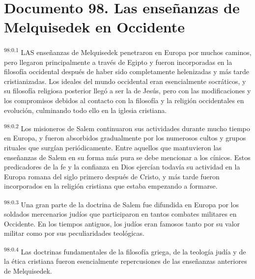 \chapter{Documento 98. Las enseñanzas de Melquisedek en Occidente}
\par
\textsuperscript{98:0.1} LAS enseñanzas de Melquisedek penetraron en Europa por muchos caminos, pero llegaron principalmente a través de Egipto y fueron incorporadas en la filosofía occidental después de haber sido completamente helenizadas y más tarde cristianizadas. Los ideales del mundo occidental eran esencialmente socráticos, y su filosofía religiosa posterior llegó a ser la de Jesús, pero con las modificaciones y los compromisos debidos al contacto con la filosofía y la religión occidentales en evolución, culminando todo ello en la iglesia cristiana.

\par
\textsuperscript{98:0.2} Los misioneros de Salem continuaron sus actividades durante mucho tiempo en Europa, y fueron absorbidos gradualmente por los numerosos cultos y grupos rituales que surgían periódicamente. Entre aquellos que mantuvieron las enseñanzas de Salem en su forma más pura se debe mencionar a los cínicos. Estos predicadores de la fe y la confianza en Dios ejercían todavía su actividad en la Europa romana del siglo primero después de Cristo, y más tarde fueron incorporados en la religión cristiana que estaba empezando a formarse.

\par
\textsuperscript{98:0.3} Una gran parte de la doctrina de Salem fue difundida en Europa por los soldados mercenarios judíos que participaron en tantos combates militares en Occidente. En los tiempos antiguos, los judíos eran famosos tanto por su valor militar como por sus peculiaridades teológicas.

\par
\textsuperscript{98:0.4} Las doctrinas fundamentales de la filosofía griega, de la teología judía y de la ética cristiana fueron esencialmente repercusiones de las enseñanzas anteriores de Melquisedek.

